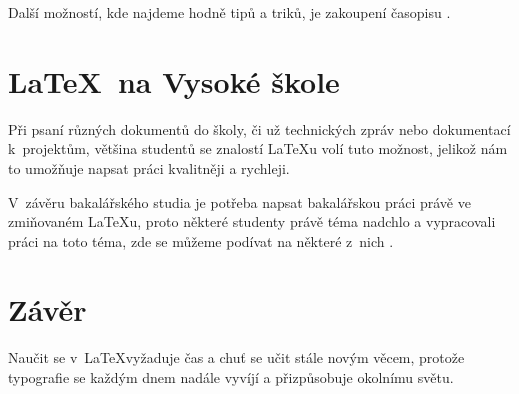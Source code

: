 \documentclass[11pt,a4paper]{article}
\begin{document}
Další možností, kde najdeme hodně tipů a triků, je zakoupení časopisu \cite{Typo}.
\section*{\LaTeX\ na Vysoké škole}
Při psaní různých dokumentů do školy, či už technických zpráv nebo dokumentací k~projektům, většina studentů se znalostí \LaTeX u volí tuto možnost, jelikož nám to umožňuje napsat práci kvalitněji a rychleji.

V~závěru bakalářského studia je potřeba napsat bakalářskou práci právě ve zmiňovaném \LaTeX u, proto některé studenty právě téma  nadchlo a vypracovali práci na toto téma, zde se můžeme podívat na některé z~nich \cite{Bakalarka} \cite{Diplomka}. 

\section*{Závěr}
Naučit se v~\LaTeX vyžaduje čas a chuť se učit stále novým věcem, protože typografie se každým dnem nadále vyvíjí a přizpůsobuje okolnímu světu. 

\newpage
\renewcommand{\refname}{Reference}

\end{document}
